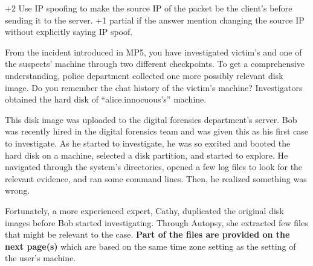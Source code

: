 \documentclass[addpoints]{exam}
\begin{document}
\begin{questions}
\begin{parts}
\begin{solutionorbox}[1in]
+2 Use IP spoofing to make the source IP of the packet be the client's before sending it to the server.  +1 partial if the answer mention changing the source IP without explicitly saying IP spoof.
\end{solutionorbox}


\end{parts}

\pagebreak


From the incident introduced in MP5, you have investigated victim's
and one of the suspects' machine through two different checkpoints.
To get a comprehensive understanding, police department collected one
more possibly relevant disk image. Do you remember the chat history of
the victim's machine? Investigators obtained the hard disk of
``alice.innocuous's'' machine.

This disk image was uploaded to the digital forensics department's
server. Bob was recently hired in the digital forensics team and was
given this as his first case to investigate. As he started to
investigate, he was so excited and booted the hard disk on a machine,
selected a disk partition, and started to explore. He navigated
through the system's directories, opened a few log files to look for
the relevant evidence, and ran some command lines. Then, he realized
something was wrong.

Fortunately, a more experienced expert, Cathy, duplicated the original
disk images before Bob started investigating. Through Autopsy, she
extracted few files that might be relevant to the case. \textbf{Part
  of the files are provided on the next page(s)} which are based on
the same time zone setting as the setting of the user's machine.

\end{questions}
\end{document}
